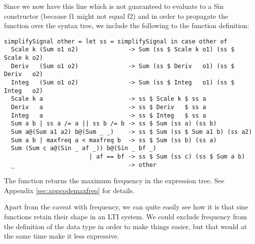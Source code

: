 Since we now have this line which is not guaranteed to evaluate to a Sin constructor (because f1 might not equal f2) and in order to propagate the function  over the syntax tree, we include the following to the function definition:
\iffalse
\begin{verbatim}
simplifySignal (Scale k other)
  | other /= other' = simplifySignal $ Scale k other' where 
             other' = simplifySignal other
simplifySignal (Deriv other)
  | other /= other' = simplifySignal $ Deriv   other' where 
             other' = simplifySignal other
simplifySignal (Integ other)
  | other /= other' = simplifySignal $ Integ   other' where 
             other' = simplifySignal other
simplifySignal (Sum o1 o2)
  | o1 /= o1' || o2 /= o2' = simplifySignal $ Sum o1' o2' where
    o1' = simplifySignal o1
    o2' = simplifySignal o2
simplifySignal other = other
\end{verbatim}
\fi
\begin{codefig}
\begin{verbatim}
simplifySignal other = let ss = simplifySignal in case other of
  Scale k (Sum o1 o2)              -> Sum (ss $ Scale k o1) (ss $ Scale k o2)
  Deriv   (Sum o1 o2)              -> Sum (ss $ Deriv   o1) (ss $ Deriv   o2)
  Integ   (Sum o1 o2)              -> Sum (ss $ Integ   o1) (ss $ Integ   o2)
  Scale k a                        -> ss $ Scale k $ ss a
  Deriv   a                        -> ss $ Deriv   $ ss a
  Integ   a                        -> ss $ Integ   $ ss a
  Sum a b | ss a /= a || ss b /= b -> ss $ Sum (ss a) (ss b)
  Sum a@(Sum a1 a2) b@(Sum _ _)    -> ss $ Sum (ss $ Sum a1 b) (ss a2)
  Sum a b | maxfreq a < maxfreq b  -> ss $ Sum (ss b) (ss a)
  Sum (Sum c a@(Sin _ af _)) b@(Sin _ bf _)
                        | af == bf -> ss $ Sum (ss c) (ss $ Sum a b)
  _                                -> other
\end{verbatim}
\caption{The function  returns the maximum frequency in the expression tree. See Appendix \ref{sec:appcodemaxfreq} for details.}
\label{code:simplifycont}
\end{codefig}
Apart from the caveat with frequency, we can quite easily see how it is that sine functions retain their shape in an LTI system. We could exclude frequency from the definition of the data type in order to make things easier, but that would at the same time make it less expressive.

